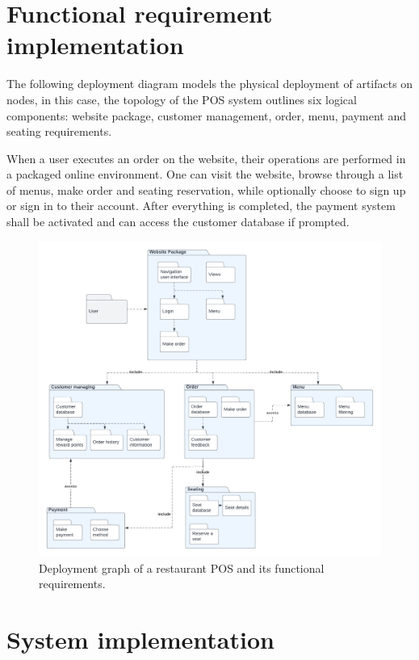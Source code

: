 \documentclass[12pt, a4paper]{article}
\theoremstyle{styleth}
\theoremstyle{styledef}
\begin{document}
\section{Functional requirement implementation} 

The following deployment diagram models the physical deployment of artifacts on nodes, in this case, the topology of the POS system outlines six logical components: website package, customer management, order, menu, payment and seating requirements.

\vspace{5mm}
When a user executes an order on the website, their operations are performed in a packaged online environment. One can visit the website, browse through a list of menus, make order and seating reservation, while optionally choose to sign up or sign in to their account. After everything is completed, the payment system shall be activated and can access the customer database if prompted.

\begin{figure}
	\centering
	\includegraphics[width=18cm]{functrq.png}
	\caption{Deployment graph of a restaurant POS and its functional requirements.}
	\label{fig:reqdiag}
\end{figure}

\newpage
\section*{System implementation}
%
\end{document}
